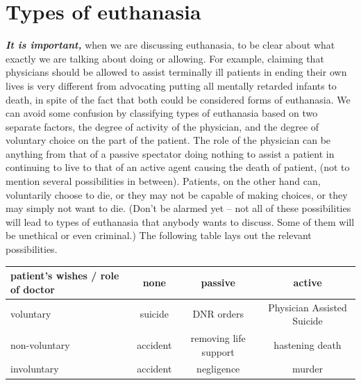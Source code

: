 \documentclass[
  12pt, openany]{book}
\theoremstyle{definition}
\theoremstyle{definition}
\theoremstyle{definition}
\theoremstyle{definition}
\theoremstyle{remark}
\begin{document}
\hypertarget{types-of-euthanasia}{%
\section{Types of euthanasia}\label{types-of-euthanasia}}

\textbf{\emph{It is important,}} when we are discussing euthanasia, to be clear about what exactly we are talking about doing or allowing. For example, claiming that physicians should be allowed to assist terminally ill patients in ending their own lives is very different from advocating putting all mentally retarded infants to death, in spite of the fact that both could be considered forms of euthanasia. We can avoid some confusion by classifying types of euthanasia based on two separate factors, the degree of activity of the physician, and the degree of voluntary choice on the part of the patient. The role of the physician can be anything from that of a passive spectator doing nothing to assist a patient in continuing to live to that of an active agent causing the death of patient, (not to mention several possibilities in between). Patients, on the other hand can, voluntarily choose to die, or they may not be capable of making choices, or they may simply not want to die. (Don't be alarmed yet -- not all of these possibilities will lead to types of euthanasia that anybody wants to discuss. Some of them will be unethical or even criminal.) The following table lays out the relevant possibilities.

\begin{longtable}[]{@{}lccc@{}}
\toprule
patient's wishes / role of doctor & none & passive & active\tabularnewline
\midrule
\endhead
voluntary & suicide & DNR orders & Physician Assisted Suicide\tabularnewline
non-voluntary & accident & removing life support & hastening death\tabularnewline
involuntary & accident & negligence & murder\tabularnewline
\bottomrule
\end{longtable}
\end{document}
